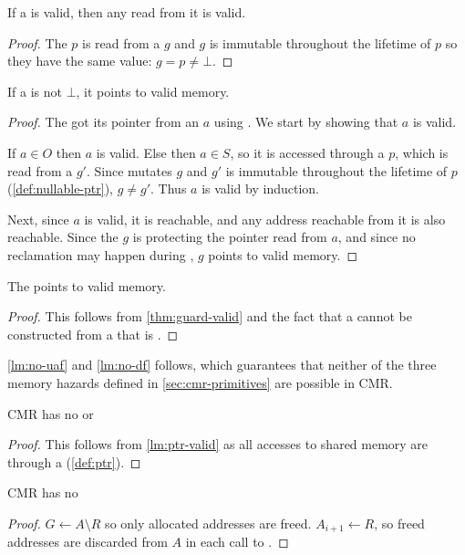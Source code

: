 \begin{lemma}
If a  is valid, then any  read from it is valid.
\end{lemma}
\begin{proof}
  The  $p$ is read from a  $g$ and $g$ is immutable throughout the lifetime of
  $p$ so they have the same value: $g = p \neq \bot$.
\end{proof}

\begin{theorem}\label{thm:guard-valid}
  If a  is not $\bot$, it points to valid memory.
\end{theorem}
\begin{proof}
  The  got its pointer from an  $a$ using .
  We start by showing that $a$ is valid.

  If $a \in O$ then $a$ is valid.  Else then $a \in S$, so
  it is accessed through a  $p$, which is read from a  $g'$.  Since
   mutates $g$ and $g'$ is immutable throughout the lifetime of $p$
  (\cref{def:nullable-ptr}), $g \neq g'$. Thus $a$ is valid by induction.

  Next, since $a$ is valid, it is reachable, and any address reachable from it is also reachable.
  Since the  $g$ is protecting the pointer read from $a$, and since no reclamation may
  happen during , $g$ points to valid memory.
\end{proof}

\begin{lemma}\label{lm:ptr-valid}
  The  points to valid memory.
\end{lemma}
\begin{proof}
  This follows from \cref{thm:guard-valid} and the fact that a  cannot be constructed from
  a  that is \nullptr.
\end{proof}

\cref{lm:no-uaf} and \cref{lm:no-df} follows, which guarantees that neither of the three memory
hazards defined in \cref{sec:cmr-primitives} are possible in CMR.

\begin{lemma}\label{lm:no-uaf}
  CMR has no  or 
\end{lemma}
\begin{proof}
  This follows from \cref{lm:ptr-valid} as all accesses to shared memory are through a 
  (\cref{def:ptr}).
\end{proof}

\begin{lemma}\label{lm:no-df}
  CMR has no 
\end{lemma}
\begin{proof}
  $G \gets A \setminus R$ so only allocated addresses are freed. $A_{i+1} \gets R$, so freed
  addresses are discarded from $A$ in each call to .
\end{proof}

